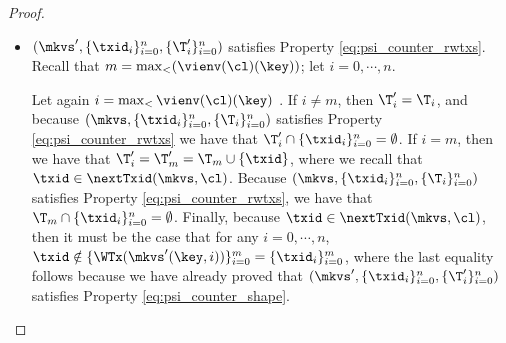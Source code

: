 \begin{proof}
\begin{itemize}
\begin{itemize}
%

\item $(\mkvs',  \{\txid_{i}\}_{i=0}^{n}, \{\T'_{i}\}_{i=0}^{n})$ satisfies Property \eqref{eq:psi_counter_rwtxs}. 
Recall that $m = \max_{<}(\vienv(\cl)(\key))$; let $i=0,\cdots,n$.

Let again $i = \max_{<}\vienv(\cl)(\key)$ . 
If $i \neq m$, then $\T'_{i} = \T_{i}$, and because $(\mkvs,  \{\txid_{i}\}_{i=0}^{n}, \{\T_{i}\}_{i=0}^{n})$ 
satisfies Property \eqref{eq:psi_counter_rwtxs} 
we have that $\T'_{i} \cap \{\txid_{i}\}_{i=0}^{n} = \emptyset$. If $i = m$, then 
we have that $\T'_{i} = \T'_{m} = \T_{m} \cup \{\txid\}$, where we recall that $\txid \in \nextTxid(\mkvs, \cl)$. 
Because $(\mkvs,  \{\txid_{i}\}_{i=0}^{n}, \{\T_{i}\}_{i=0}^{n})$ 
satisfies Property \eqref{eq:psi_counter_rwtxs}, we have that $\T_{m} \cap \{\txid_{i}\}_{i=0}^{n} 
= \emptyset$. Finally, because $\txid \in \nextTxid(\mkvs,\cl)$, then it must be the case that 
for any $i = 0,\cdots, n$, $\txid \notin \{\WTx(\mkvs'(\key,i))\}_{i=0}^{m} = \{\txid_{i}\}_{i=0}^{m}$,  
where the last equality follows because we have already proved that $(\mkvs',  \{\txid_{i}\}_{i=0}^{n}, \{\T'_{i}\}_{i=0}^{n})$ 
satisfies Property \eqref{eq:psi_counter_shape}.


\end{itemize}
\end{itemize}
\end{proof}
